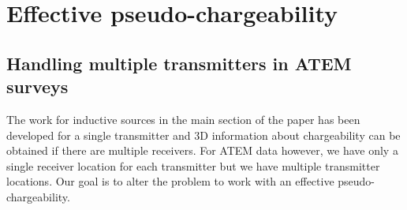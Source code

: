 \documentclass[extra,mreferee]{gji}
\begin{document}
\appendix

\section{Effective pseudo-chargeability}
\subsection{Handling multiple transmitters in ATEM surveys}
\label{subsection: Handling multiple transmitters in ATEM surveys}
The work for inductive sources in the main section of the paper has been developed for a single transmitter and 3D information about chargeability can be obtained if there are multiple receivers. For ATEM data however, we have only a single receiver location for each transmitter but we have multiple transmitter locations.
Our goal is to alter the problem to work with an effective pseudo-chargeability.
\end{document}
